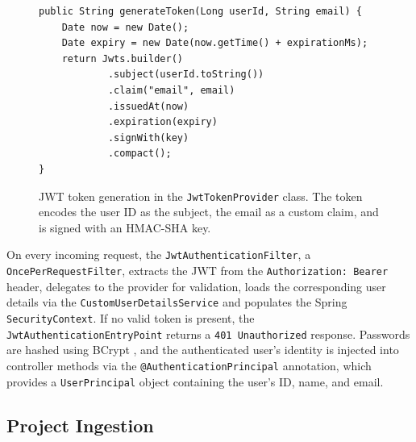 
\begin{figure}[htbp]
    \begin{verbatim}
public String generateToken(Long userId, String email) {
    Date now = new Date();
    Date expiry = new Date(now.getTime() + expirationMs);
    return Jwts.builder()
            .subject(userId.toString())
            .claim("email", email)
            .issuedAt(now)
            .expiration(expiry)
            .signWith(key)
            .compact();
}
    \end{verbatim}
    \caption{JWT token generation in the \texttt{JwtTokenProvider} class. The token encodes the user ID as the subject, the email as a custom claim, and is signed with an HMAC-SHA key.}
    \label{lst:jwt-generate}
\end{figure}

On every incoming request, the \texttt{JwtAuthenticationFilter}, a \texttt{Once\-Per\-Re\-questFil\-ter}, extracts the JWT from the \texttt{Authorization: Bearer} header, delegates to the provider for validation, loads the corresponding user details via the \texttt{Cus\-tomU\-serDe\-tailsSer\-vice} and populates the Spring \texttt{ SecurityContext}. If no valid token is present, the \texttt{JwtAuthenticationEntryPoint} returns a \texttt{401 Un\-au\-thor\-ized} response. Passwords are hashed using BCrypt \cite{Provos1999}, and the authenticated user's identity is injected into controller methods via the \texttt{@Au\-then\-ti\-ca\-tionPrin\-ci\-pal} annotation, which provides a \texttt{UserPrincipal} object containing the user's ID, name, and email.

\subsection{Project Ingestion}
\label{subsec:project-ingestion}

